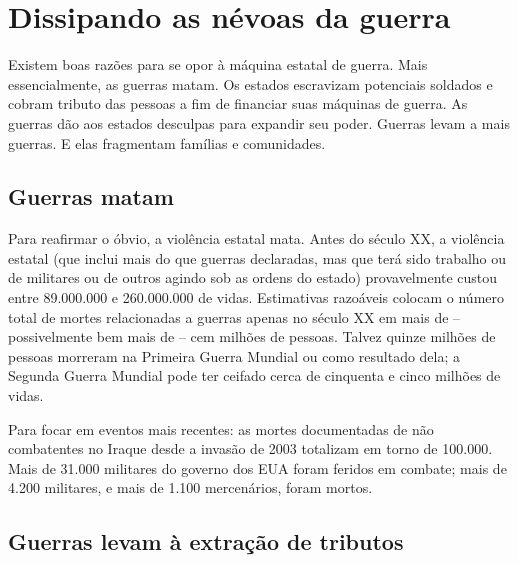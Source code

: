 \section{Dissipando as névoas da guerra}

Existem boas razões para se opor à máquina estatal de guerra. Mais essencialmente, as guerras matam. Os estados escravizam potenciais soldados e cobram tributo das pessoas a fim de financiar suas máquinas de guerra. As guerras dão aos estados desculpas para expandir seu poder. Guerras levam a mais guerras. E elas fragmentam famílias e comunidades.

\subsection*{Guerras matam}

Para reafirmar o óbvio, a violência estatal mata. Antes do século XX, a violência estatal (que inclui mais do que guerras declaradas, mas que terá sido trabalho ou de militares ou de outros agindo sob as ordens do estado) provavelmente custou entre 89.000.000 e 260.000.000 de vidas. Estimativas razoáveis colocam o número total de mortes relacionadas a guerras apenas no século XX em mais de -- possivelmente bem mais de -- cem milhões de pessoas. Talvez quinze milhões de pessoas morreram na Primeira Guerra Mundial ou como resultado dela; a Segunda Guerra Mundial pode ter ceifado cerca de cinquenta e cinco milhões de vidas.

Para focar em eventos mais recentes: as mortes documentadas de não combatentes no Iraque desde a invasão de 2003 totalizam em torno de 100.000. Mais de 31.000 militares do governo dos EUA foram feridos em combate; mais de 4.200 militares, e mais de 1.100 mercenários, foram mortos.

\subsection*{Guerras levam à extração de tributos}

